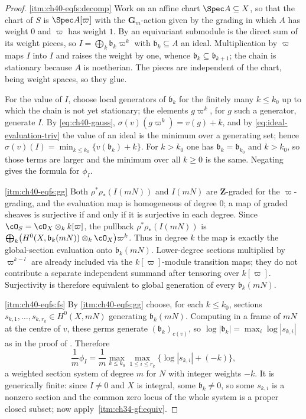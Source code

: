 \begin{proof}
\cref{itm:ch40-eqfs:decomp}  Work on an affine chart
$\Spec A\subseteq X$, so that the chart of $S$ is
$\Spec A[\varpi]$ with the $\mathbf G_m$-action given by the grading in
which $A$ has weight $0$ and $\varpi$ has weight $1$.  By
 an equivariant submodule is the direct
sum of its weight pieces, so $I=\bigoplus_k\mathfrak b_k\varpi^k$ with
$\mathfrak b_k\subseteq A$ an ideal.  Multiplication by $\varpi$ maps
$I$ into $I$ and raises the weight by one, whence
$\mathfrak b_k\subseteq\mathfrak b_{k+1}$; the chain is stationary because
$A$ is noetherian.  The pieces are independent of the chart, being weight
spaces, so they glue.

For the value of $I$, choose local generators of $\mathfrak b_k$ for the
finitely many $k\le k_0$ up to which the chain is not yet stationary; the
elements $g\varpi^k$, for $g$ such a generator, generate $I$.  By
\eqref{eq:ch40-gauss}, $\sigma(v)(g\varpi^k)=v(g)+k$, and by
\eqref{eq:ideal-evaluation-triv} the value of an ideal is the minimum over a
generating set; hence
$\sigma(v)(I)=\min_{k\le k_0}\{v(\mathfrak b_k)+k\}$.  For $k>k_0$ one
has $\mathfrak b_k=\mathfrak b_{k_0}$ and $k>k_0$, so those terms are
larger and the minimum over all $k\ge0$ is the same.  Negating gives the
formula for $\phi_I$.

\cref{itm:ch40-eqfs:gg}  Both $\rho^*\rho_*(I(mN))$ and $I(mN)$ are
$\mathbf Z$-graded for the $\varpi$-grading, and the evaluation map is
homogeneous of degree $0$; a map of graded sheaves is surjective if and
only if it is surjective in each degree.  Since $\cO_S=\cO_X\otimes_k k[\varpi]$, the pullback
$\rho^*\rho_*(I(mN))$ is
$\bigoplus_k\bigl(H^0(X,\mathfrak b_k(mN))\otimes_k\cO_X\bigr)\varpi^k$.
Thus in degree $k$ the map is exactly the global-section evaluation
onto $\mathfrak b_k(mN)$.  Lower-degree sections multiplied by
$\varpi^{k-l}$ are already included via the $k[\varpi]$-module
transition maps; they do not contribute a separate independent summand
after tensoring over $k[\varpi]$.  Surjectivity is therefore equivalent
to global generation of every $\mathfrak b_k(mN)$.

\cref{itm:ch40-eqfs:fs}  By \cref{itm:ch40-eqfs:gg} choose, for each
$k\le k_0$, sections $s_{k,1},\ldots,s_{k,r_k}\in H^0(X,mN)$ generating
$\mathfrak b_k(mN)$.  Computing in a frame of $mN$ at the centre of
$v$, these germs generate $(\mathfrak b_k)_{c(v)}$, so
$\log|\mathfrak b_k|=\max_i\log|s_{k,i}|$ as in the proof of
.  Therefore
\[
 \frac1m\phi_I
 =\frac1m\max_{k\le k_0}\max_{1\le i\le r_k}
  \bigl\{\log|s_{k,i}|+(-k)\bigr\},
\]
a weighted section system of degree $m$ for $N$ with integer weights
$-k$.  It is generically finite: since $I\ne0$ and $X$ is integral,
some $\mathfrak b_k\ne0$, so some $s_{k,i}$ is a nonzero section and the
common zero locus of the whole system is a proper closed subset; now apply
\,\cref{itm:ch34-gf:equiv}.
\end{proof}

